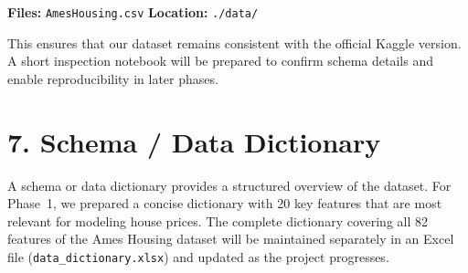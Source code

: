 \documentclass[12pt,a4paper]{article}
\begin{document}
\textbf{Files:} \texttt{AmesHousing.csv}  
\textbf{Location:} \texttt{./data/}  

This ensures that our dataset remains consistent with the official Kaggle version. A short inspection notebook will be prepared to confirm schema details and enable reproducibility in later phases.

\section*{7. Schema / Data Dictionary}
A schema or data dictionary provides a structured overview of the dataset.  
For Phase~1, we prepared a concise dictionary with 20 key features that are most relevant for modeling house prices.  
The complete dictionary covering all 82 features of the Ames Housing dataset will be maintained separately in an Excel file (\texttt{data\_dictionary.xlsx}) and updated as the project progresses.  
\end{document}

